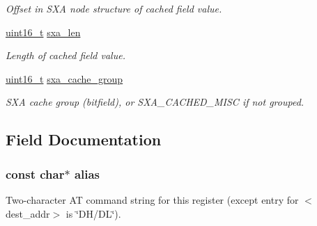 \begin{DoxyCompactItemize}
\begin{DoxyCompactList}\small\item\em Offset in S\-X\-A node structure of cached field value. \end{DoxyCompactList}\item 
\hypertarget{struct__xbee__reg__descr__t_afffefbb55b7d4e0f2932567b30161167}{\hyperlink{group__hal_ga5a8b2dc9e45a9ee81a94ef304fb62505}{uint16\-\_\-t} \hyperlink{struct__xbee__reg__descr__t_afffefbb55b7d4e0f2932567b30161167}{sxa\-\_\-len}}\label{struct__xbee__reg__descr__t_afffefbb55b7d4e0f2932567b30161167}

\begin{DoxyCompactList}\small\item\em Length of cached field value. \end{DoxyCompactList}\item 
\hypertarget{struct__xbee__reg__descr__t_a4ef83a005ab7c0854ce2de3973b2a3df}{\hyperlink{group__hal_ga5a8b2dc9e45a9ee81a94ef304fb62505}{uint16\-\_\-t} \hyperlink{struct__xbee__reg__descr__t_a4ef83a005ab7c0854ce2de3973b2a3df}{sxa\-\_\-cache\-\_\-group}}\label{struct__xbee__reg__descr__t_a4ef83a005ab7c0854ce2de3973b2a3df}

\begin{DoxyCompactList}\small\item\em S\-X\-A cache group (bitfield), or S\-X\-A\-\_\-\-C\-A\-C\-H\-E\-D\-\_\-\-M\-I\-S\-C if not grouped. \end{DoxyCompactList}\end{DoxyCompactItemize}


\subsection{Field Documentation}
\hypertarget{struct__xbee__reg__descr__t_aae877041546563a319dff9e25bc3aaf7}{
\subsubsection[{alias}]{\setlength{\rightskip}{0pt plus 5cm}const char$\ast$ alias}}\label{struct__xbee__reg__descr__t_aae877041546563a319dff9e25bc3aaf7}


Two-\/character A\-T command string for this register (except entry for $<$dest\-\_\-addr$>$ is \char`\"{}\-D\-H/\-D\-L\char`\"{}). 

